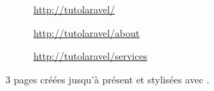 \begin{figure}[!h]
    \begin{subfigure}[c]{0.60\textwidth}
    \end{subfigure}\hfill
    \begin{subfigure}[c]{0.35\textwidth}
        \caption{\url{http://tutolaravel/}} 
    \end{subfigure}
    \begin{subfigure}[c]{0.60\textwidth}
    \end{subfigure}\hfill
    \begin{subfigure}[c]{0.35\textwidth}
        \caption{\url{http://tutolaravel/about}}
    \end{subfigure}
    \begin{subfigure}[c]{0.60\textwidth}
    \end{subfigure}\hfill
    \begin{subfigure}[c]{0.35\textwidth}
        \caption{\url{http://tutolaravel/services}} 
    \end{subfigure}
    \caption{3 pages créées jusqu'à présent et stylisées avec \tailwind{}.}
    \label{fig:3pages}
\end{figure}

